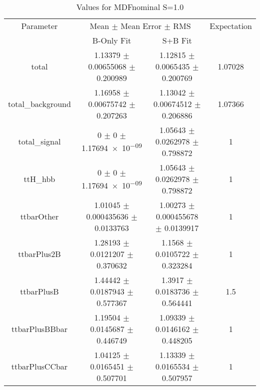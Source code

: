 \begin{table}
\centering
\caption{Values for MDFnominal S=1.0}
\begin{tabular}{cccc}
\toprule
Parameter & \multicolumn{2}{c}{Mean $\pm$ Mean Error $\pm$ RMS} & Expectation\\
 & B-Only Fit & S+B Fit & \\
\midrule
total & \num{1.13379} $\pm$ \num{0.00655068} $\pm$ \num{0.200989} & \num{1.12815} $\pm$ \num{0.0065435} $\pm$ \num{0.200769} & \num{1.07028}\\
total\_background & \num{1.16958} $\pm$ \num{0.00675742} $\pm$ \num{0.207263} & \num{1.13042} $\pm$ \num{0.00674512} $\pm$ \num{0.206886} & \num{1.07366}\\
total\_signal & \num{0} $\pm$ \num{0} $\pm$ \num{1.17694e-09} & \num{1.05643} $\pm$ \num{0.0262978} $\pm$ \num{0.798872} & \num{1}\\
ttH\_hbb & \num{0} $\pm$ \num{0} $\pm$ \num{1.17694e-09} & \num{1.05643} $\pm$ \num{0.0262978} $\pm$ \num{0.798872} & \num{1}\\
ttbarOther & \num{1.01045} $\pm$ \num{0.000435636} $\pm$ \num{0.0133763} & \num{1.00273} $\pm$ \num{0.000455678} $\pm$ \num{0.0139917} & \num{1}\\
ttbarPlus2B & \num{1.28193} $\pm$ \num{0.0121207} $\pm$ \num{0.370632} & \num{1.1568} $\pm$ \num{0.0105722} $\pm$ \num{0.323284} & \num{1}\\
ttbarPlusB & \num{1.44442} $\pm$ \num{0.0187943} $\pm$ \num{0.577367} & \num{1.3917} $\pm$ \num{0.0183736} $\pm$ \num{0.564441} & \num{1.5}\\
ttbarPlusBBbar & \num{1.19504} $\pm$ \num{0.0145687} $\pm$ \num{0.446749} & \num{1.09339} $\pm$ \num{0.0146162} $\pm$ \num{0.448205} & \num{1}\\
ttbarPlusCCbar & \num{1.04125} $\pm$ \num{0.0165451} $\pm$ \num{0.507701} & \num{1.13339} $\pm$ \num{0.0165534} $\pm$ \num{0.507957} & \num{1}\\
\bottomrule
\end{tabular}
\end{table}